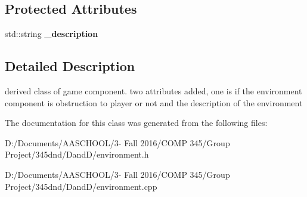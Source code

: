 \subsection*{Protected Attributes}
\begin{DoxyCompactItemize}
\item 
\hypertarget{class_environment_ab34a6cfaa80a2799a23916b7cab95cb5}{}\label{class_environment_ab34a6cfaa80a2799a23916b7cab95cb5} 
std\+::string {\bfseries \+\_\+description}
\end{DoxyCompactItemize}


\subsection{Detailed Description}
derived class of game component. two attributes added, one is if the environment component is obstruction to player or not and the description of the environment 

The documentation for this class was generated from the following files\+:\begin{DoxyCompactItemize}
\item 
D\+:/\+Documents/\+A\+A\+S\+C\+H\+O\+O\+L/3-\/ Fall 2016/\+C\+O\+M\+P 345/\+Group Project/345dnd/\+Dand\+D/environment.\+h\item 
D\+:/\+Documents/\+A\+A\+S\+C\+H\+O\+O\+L/3-\/ Fall 2016/\+C\+O\+M\+P 345/\+Group Project/345dnd/\+Dand\+D/environment.\+cpp\end{DoxyCompactItemize}
